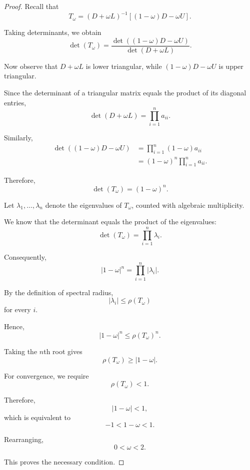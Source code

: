 \documentclass[11pt,a4paper]{article}
\theoremstyle{definition}
\theoremstyle{remark}
\begin{document}
\begin{proof}
Recall that
\[
    T_\omega
    =
    (D+\omega L)^{-1}
    \left[(1-\omega)D-\omega U\right].
\]

Taking determinants, we obtain
\[
\det(T_\omega)
=
\frac{
\det\left((1-\omega)D-\omega U\right)
}{
\det(D+\omega L)
}.
\]

Now observe that $D+\omega L$ is lower triangular,
while $(1-\omega)D-\omega U$ is upper triangular.

Since the determinant of a triangular matrix equals
the product of its diagonal entries,
\[
    \det(D+\omega L)
    =
    \prod_{i=1}^{n}a_{ii}.
\]

Similarly,
\[
\begin{aligned}
\det\left((1-\omega)D-\omega U\right)
&=
\prod_{i=1}^{n}(1-\omega)a_{ii}\\
&=
(1-\omega)^n\prod_{i=1}^{n}a_{ii}.
\end{aligned}
\]

Therefore,
\begin{equation}
    \boxed{
    \det(T_\omega)=(1-\omega)^n.
    }
    \label{eq:sor_determinant}
\end{equation}

Let $\lambda_1,\ldots,\lambda_n$ denote the
eigenvalues of $T_\omega$, counted with
algebraic multiplicity.

We know that the determinant equals the product
of the eigenvalues:
\[
    \det(T_\omega)
    =
    \prod_{i=1}^{n}\lambda_i.
\]

Consequently,
\[
    |1-\omega|^n
    =
    \prod_{i=1}^{n}|\lambda_i|.
\]

By the definition of spectral radius,
\[
    |\lambda_i|\leq\rho(T_\omega)
\]
for every $i$.

Hence,
\[
    |1-\omega|^n
    \leq
    \rho(T_\omega)^n.
\]

Taking the $n$th root gives
\begin{equation}
    \boxed{
    \rho(T_\omega)\geq|1-\omega|.
    }
    \label{eq:sor_spectral_lower_bound}
\end{equation}

For convergence, we require
\[
    \rho(T_\omega)<1.
\]

Therefore,
\[
    |1-\omega|<1,
\]
which is equivalent to
\[
    -1<1-\omega<1.
\]

Rearranging,
\[
    \boxed{0<\omega<2.}
\]

This proves the necessary condition.
\end{proof}
\end{document}
